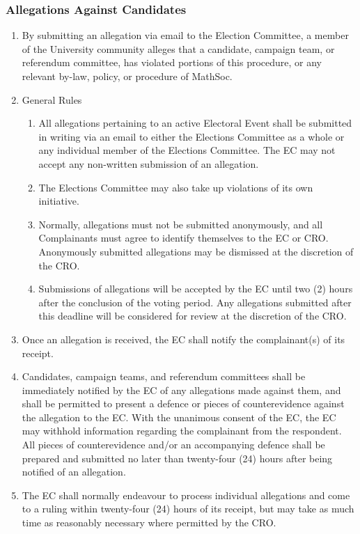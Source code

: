 \subsubsection{Allegations Against Candidates}
		\begin{enumerate}
			\item By submitting an allegation via email to the Election Committee, a member of the University community alleges that a candidate, campaign team, or referendum committee, has violated portions of this procedure, or any relevant by-law, policy, or procedure of MathSoc.
			\item General Rules 
				\begin{enumerate}
					\item All allegations pertaining to an active Electoral Event shall be submitted in writing via an email to either the Elections Committee as a whole or any individual member of the Elections Committee. The EC may not accept any non-written submission of an allegation.
					\item The Elections Committee may also take up violations of its own initiative.
					\item Normally, allegations must not be submitted anonymously, and all Complainants must agree to identify themselves to the EC or CRO. Anonymously submitted allegations may be dismissed at the discretion of the CRO.
					\item Submissions of allegations will be accepted by the EC until two (2) hours after the conclusion of the voting period. Any allegations submitted after this deadline will be considered for review at the discretion of the CRO.
				\end{enumerate}
			\item Once an allegation is received, the EC shall notify the complainant(s) of its receipt.
			\item Candidates, campaign teams, and referendum committees shall be immediately notified by the EC of any allegations made against them, and shall be permitted to present a defence or pieces of counterevidence against the allegation to the EC. With the unanimous consent of the EC, the EC may withhold information regarding the complainant from the respondent. All pieces of counterevidence and/or an accompanying defence shall be prepared and submitted no later than twenty-four (24) hours after being notified of an allegation.
			\item The EC shall normally endeavour to process individual allegations and come to a ruling within twenty-four (24) hours of its receipt, but may take as much time as reasonably necessary where permitted by the CRO.

\end{enumerate}
